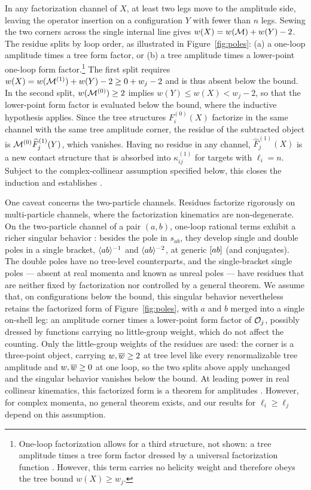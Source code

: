 \begin{subappendices}
In any factorization channel of $X$, at least two legs move to the amplitude side, leaving the operator insertion on a configuration $Y$ with fewer than $n$ legs. Sewing the two corners across the single internal line gives $w(X) = w(\mathcal{M}) + w(Y) - 2$.
The residue splits by loop order, as illustrated in Figure~\ref{fig:poles}: (a) a one-loop amplitude times a tree form factor, or (b) a tree amplitude times a lower-point one-loop form factor.\footnote{One-loop factorization allows for a third structure, not shown: a tree amplitude times a tree form
factor dressed by a universal factorization function \cite{Bern:1995ix}.
However, this term carries no helicity weight and therefore obeys the tree bound $w(X)\ge w_j$.}
The first split requires $w(X) = w(\mathcal{M}^{(1)}) + w(Y) - 2 \ge 0 + w_j - 2$ and is thus absent below the bound.
In the second split, $w(\mathcal{M}^{(0)}) \ge 2$ implies $w(Y) \le w(X) < w_j - 2$, so that the lower-point form factor is evaluated below the bound, where the inductive hypothesis applies. Since the tree structures $F^{(0)}_i(X)$ factorize in the same channel with the same tree amplitude corner, the residue of the subtracted object is $\mathcal{M}^{(0)} \widehat F^{(1)}_j(Y)$, which vanishes.
Having no residue in any channel, $\widehat F^{(1)}_j(X)$ is a new contact structure that is absorbed into $\kappa^{(1)}_{ij}$ for targets with $\ell_i = n$.
Subject to the complex-collinear assumption specified below, this closes the induction and
establishes .

One caveat concerns the two-particle channels.
Residues factorize rigorously on multi-particle channels, where the factorization kinematics are non-degenerate.
On the two-particle channel of a pair $(a,b)$, one-loop rational terms exhibit a richer singular behavior \cite{Bern:2005hs,Bern:2005ji,Bern:2005cq}: besides the pole in $s_{ab}$, they develop single and double poles in a single bracket, $\langle a b \rangle^{-1}$ and $\langle a b \rangle^{-2}$, at generic $\lbrack a b \rbrack$ (and conjugates).
The double poles have no tree-level counterparts, and the single-bracket single poles --- absent at real momenta and known as unreal poles --- have residues that are neither fixed by factorization nor controlled by a general theorem.
We assume that, on configurations below the bound, this singular behavior nevertheless retains the factorized form of Figure~\ref{fig:poles}, with $a$ and $b$ merged into a single on-shell leg: an amplitude corner times a lower-point form factor of $\mathcal{O}_j$, possibly dressed by functions carrying no little-group weight, which do not affect the counting.
Only the little-group weights of the residues are used: the corner is a three-point object, carrying $w,\overline{w} \ge 2$ at tree level like every renormalizable tree amplitude and $w,\overline{w} \ge 0$ at one loop, so the two splits above apply unchanged and the singular behavior vanishes below the bound.
At leading power in real collinear kinematics, this factorized form is a theorem for amplitudes \cite{Bern:1995ix,Kosower:1999xi}. However, for complex momenta, no general theorem exists, and our results for $\ell_i \ge \ell_j$ depend on this assumption.


\end{subappendices}
